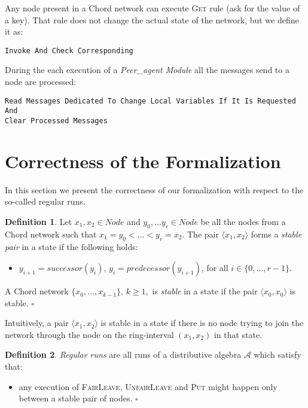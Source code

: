 \documentclass{amsart}
\theoremstyle{definition}
\newtheorem{definition}{Definition}[section]
\begin{document}
Any node present in a Chord network can execute \textsc{Get} rule (ask for the value of a key). That rule does not
change the actual state of the network, but we define it as:
\begin{lstlisting}[escapechar=\%]
Invoke And Check Corresponding \end{lstlisting}

During the each execution of a {\em Peer\_agent Module} all the messages send to a node are processed:
\begin{lstlisting}[escapechar=\%]
Read Messages Dedicated To Change Local Variables If It Is Requested And
Clear Processed Messages
\end{lstlisting}

\section{Correctness of the Formalization}
\label{dokazi}


In this section we present the correctness of our formalization with respect to the so-called regular runs.

\begin{definition}
Let $x_1, x_2 \in Node$ and $y_0, \ldots y_r \in Node$ be all the
nodes from a Chord network such that $x_1 = y_0 < \ldots < y_r =
x_2$. The pair $\langle x_1, x_2 \rangle$ forms a {\em stable
pair} in a state if the following holds:
\begin{itemize}
\item $y_{i+1} = successor (y_i)$, $y_{i} = predecessor (y_{i+1})$, for all $i \in \{ 0,\ldots ,r-1 \}$.
\end{itemize}
A Chord network $\{x_0, \ldots , x_{k-1} \}$, $k \geqslant 1,$ is
{\em stable} in a state if the pair $\langle x_0, x_0 \rangle$ is
stable. \hfill $\square$
\end{definition}
Intuitively, a pair $\langle x_1, x_2 \rangle$ is stable in a
state if there is no node trying to join the network through the
node on the ring-interval $(x_1,x_2)$ in that state.

\begin{definition}
{\em Regular runs} are all runs of a distributive algebra
$\mathcal{A}$
which satisfy that:
\begin{itemize}


    \item any execution of \textsc{FairLeave}, \textsc{UnfairLeave} and \textsc{Put} might happen only between a stable pair of nodes.
    \label{ogranicenje1}\hfill $\square$

\end{itemize}
\end{definition}
\end{document}
